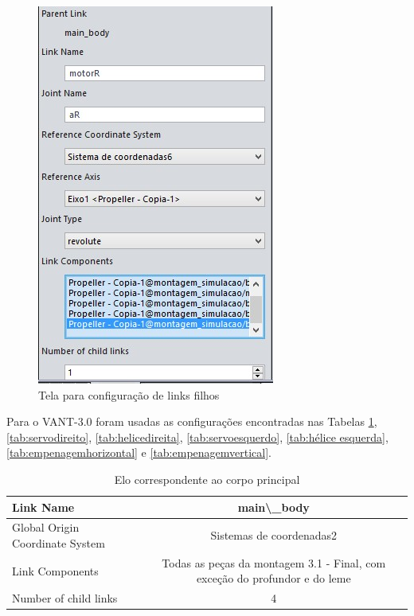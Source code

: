 \begin{figure}[!htb]%
\centering %
\includegraphics[scale=01]{Imagens/motorR.JPG} %
\caption{Tela para configuração de links filhos} %
\end{figure} %

Para o VANT-3.0 foram usadas as configurações encontradas nas Tabelas \ref{tab:mainbody}, \ref{tab:servodireito}, \ref{tab:helicedireita}, \ref{tab:servoesquerdo}, \ref{tab:hélice esquerda}, \ref{tab:empenagemhorizontal} e \ref{tab:empenagemvertical}.


\begin{table}[htbp]
\centering
\begin{tabular}{|l|cccc|}
\hline
Link Name & \multicolumn{4}{c|}{ main\textbackslash{}\_body} \\
\hline
Global Origin Coordinate System  & \multicolumn{4}{c|}{Sistemas de coordenadas2} \\
\hline
\multicolumn{1}{|p{14.715em}|}{Link Components } & \multicolumn{4}{p{18.36em}|}{Todas as peças da montagem 3.1 - Final, com exceção do profundor e do leme} \\
\hline
Number of child links & \multicolumn{4}{c|}{4} \\
\hline
\end{tabular}%
\caption{Elo correspondente ao corpo principal}
\label{tab:mainbody}%
\end{table}%


